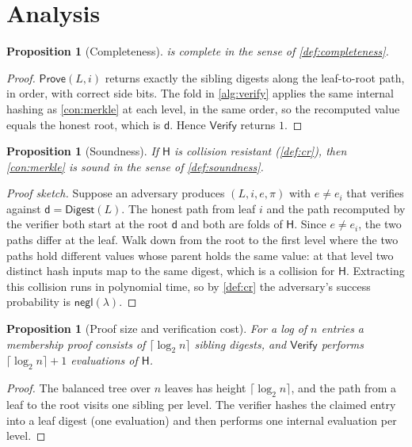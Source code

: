 \documentclass[11pt]{article}
\theoremstyle{plain}
\newtheorem{proposition}[theorem]{Proposition}
\theoremstyle{definition}
\theoremstyle{remark}
\newcommand{\hash}{\mathsf{H}}
\newcommand{\digest}{\mathsf{d}}
\newcommand{\secpar}{\lambda}
\newcommand{\negl}{\mathsf{negl}}
\begin{document}
\section{Analysis}
\label{sec:analysis}

\begin{proposition}[Completeness]
\label{prop:completeness}
 is complete in the sense of
\cref{def:completeness}.
\end{proposition}

\begin{proof}
$\mathsf{Prove}(L, i)$ returns exactly the sibling digests along the
leaf-to-root path, in order, with correct side bits. The fold in
\cref{alg:verify} applies the same internal hashing as
\cref{con:merkle} at each level, in the same order, so the recomputed
value equals the honest root, which is $\digest$. Hence $\mathsf{Verify}$
returns $1$.
\end{proof}

\begin{proposition}[Soundness]
\label{prop:soundness}
If $\hash$ is collision resistant (\cref{def:cr}), then
\cref{con:merkle} is sound in the sense of \cref{def:soundness}.
\end{proposition}

\begin{proof}[Proof sketch]
Suppose an adversary produces $(L, i, e, \pi)$ with $e \neq e_i$ that
verifies against $\digest = \mathsf{Digest}(L)$. The honest path from
leaf $i$ and the path recomputed by the verifier both start at the root
$\digest$ and both are folds of $\hash$. Since $e \neq e_i$, the two
paths differ at the leaf. Walk down from the root to the first level
where the two paths hold different values whose parent holds the same
value: at that level two distinct hash inputs map to the same digest,
which is a collision for $\hash$. Extracting this collision runs in
polynomial time, so by \cref{def:cr} the adversary's success probability
is $\negl(\secpar)$.
\end{proof}

\begin{proposition}[Proof size and verification cost]
\label{prop:size}
For a log of $n$ entries a membership proof consists of
$\lceil \log_2 n \rceil$ sibling digests, and $\mathsf{Verify}$ performs
$\lceil \log_2 n \rceil + 1$ evaluations of $\hash$.
\end{proposition}

\begin{proof}
The balanced tree over $n$ leaves has height $\lceil \log_2 n \rceil$,
and the path from a leaf to the root visits one sibling per level. The
verifier hashes the claimed entry into a leaf digest (one evaluation)
and then performs one internal evaluation per level.
\end{proof}
\end{document}
